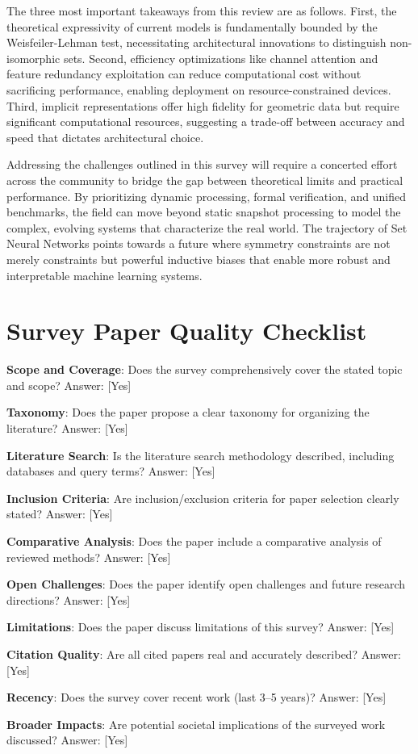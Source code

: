 \documentclass{article}
\begin{document}
The three most important takeaways from this review are as follows. First, the theoretical expressivity of current models is fundamentally bounded by the Weisfeiler-Lehman test, necessitating architectural innovations to distinguish non-isomorphic sets. Second, efficiency optimizations like channel attention and feature redundancy exploitation can reduce computational cost without sacrificing performance, enabling deployment on resource-constrained devices. Third, implicit representations offer high fidelity for geometric data but require significant computational resources, suggesting a trade-off between accuracy and speed that dictates architectural choice.

Addressing the challenges outlined in this survey will require a concerted effort across the community to bridge the gap between theoretical limits and practical performance. By prioritizing dynamic processing, formal verification, and unified benchmarks, the field can move beyond static snapshot processing to model the complex, evolving systems that characterize the real world. The trajectory of Set Neural Networks points towards a future where symmetry constraints are not merely constraints but powerful inductive biases that enable more robust and interpretable machine learning systems.

\section{Survey Paper Quality Checklist}

\label{sec:survey_paper_quality_checklist}

\textbf{Scope and Coverage}: Does the survey comprehensively cover the stated topic and scope?
Answer: [Yes]

\textbf{Taxonomy}: Does the paper propose a clear taxonomy for organizing the literature?
Answer: [Yes]

\textbf{Literature Search}: Is the literature search methodology described, including databases and query terms?
Answer: [Yes]

\textbf{Inclusion Criteria}: Are inclusion/exclusion criteria for paper selection clearly stated?
Answer: [Yes]

\textbf{Comparative Analysis}: Does the paper include a comparative analysis of reviewed methods?
Answer: [Yes]

\textbf{Open Challenges}: Does the paper identify open challenges and future research directions?
Answer: [Yes]

\textbf{Limitations}: Does the paper discuss limitations of this survey?
Answer: [Yes]

\textbf{Citation Quality}: Are all cited papers real and accurately described?
Answer: [Yes]

\textbf{Recency}: Does the survey cover recent work (last 3--5 years)?
Answer: [Yes]

\textbf{Broader Impacts}: Are potential societal implications of the surveyed work discussed?
Answer: [Yes]



\end{document}
